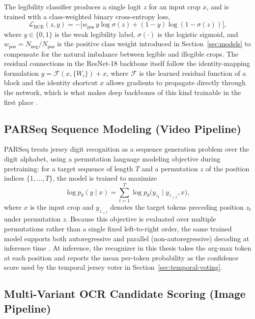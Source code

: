 The legibility classifier produces a single logit $z$ for an input crop
$x$, and is trained with a class-weighted binary cross-entropy loss,
\begin{equation}
    \mathcal{L}_{\text{BCE}}(z, y) = -\big[w_{\text{pos}}\, y \log
    \sigma(z) + (1-y) \log (1-\sigma(z))\big],
    \label{eq:bce}
\end{equation}
where $y \in \{0, 1\}$ is the weak legibility label, $\sigma(\cdot)$ is
the logistic sigmoid, and $w_{\text{pos}} = N_{\text{neg}} /
N_{\text{pos}}$ is the positive class weight introduced in
Section~\ref{sec:models} to compensate for the natural imbalance
between legible and illegible crops. The residual connections in the
ResNet-18 backbone itself follow the identity-mapping formulation
$y = \mathcal{F}(x, \{W_i\}) + x$, where $\mathcal{F}$ is the learned
residual function of a block and the identity shortcut $x$ allows
gradients to propagate directly through the network, which is what
makes deep backbones of this kind trainable in the first place
\cite{he2016resnet}.

\subsection{PARSeq Sequence Modeling (Video Pipeline)}

PARSeq treats jersey digit recognition as a sequence generation problem
over the digit alphabet, using a permutation language modeling
objective during pretraining: for a target sequence of length $T$ and a
permutation $z$ of the position indices $\{1, \dots, T\}$, the model is
trained to maximize
\begin{equation}
    \log p_\theta(y \mid x) = \sum_{t=1}^{T} \log p_\theta\big(y_{z_t}
    \mid y_{z_{<t}}, x\big),
    \label{eq:parseq}
\end{equation}
where $x$ is the input crop and $y_{z_{<t}}$ denotes the target tokens
preceding position $z_t$ under permutation $z$. Because this objective
is evaluated over multiple permutations rather than a single fixed
left-to-right order, the same trained model supports both
autoregressive and parallel (non-autoregressive) decoding at inference
time \cite{bautista2022parseq}. At inference, the recognizer in this
thesis takes the arg-max token at each position and reports the mean
per-token probability as the confidence score used by the temporal
jersey voter in Section~\ref{sec:temporal-voting}.

\subsection{Multi-Variant OCR Candidate Scoring (Image Pipeline)}

